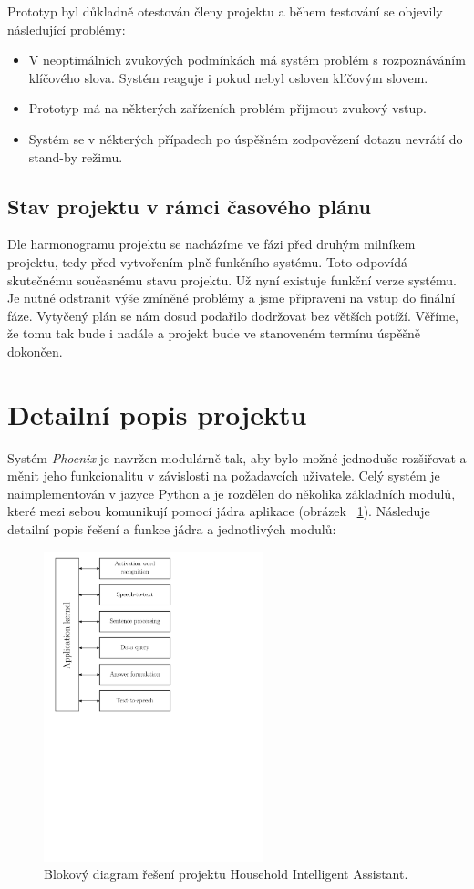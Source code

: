 \documentclass[12pt,a4paper]{article}
\begin{document}
Prototyp byl důkladně otestován členy projektu a během testování se objevily následující problémy: 
\begin{itemize}
	\item V neoptimálních zvukových podmínkách má systém problém s rozpoznáváním klíčového slova. Systém reaguje i pokud nebyl osloven klíčovým slovem.
	\item Prototyp má na některých zařízeních problém přijmout zvukový vstup.
	\item Systém se v některých případech po úspěšném zodpovězení dotazu nevrátí do stand-by režimu.
\end{itemize}


\subsection{Stav projektu v rámci časového plánu}
Dle harmonogramu projektu se nacházíme ve fázi před druhým milníkem projektu, tedy před vytvořením plně funkčního systému. Toto odpovídá skutečnému současnému stavu projektu. Už nyní existuje funkční verze systému. Je nutné odstranit výše zmíněné problémy a jsme připraveni na vstup do finální fáze. Vytyčený plán se nám dosud podařilo dodržovat bez větších potíží. Věříme, že tomu tak bude i nadále a projekt bude ve stanoveném termínu úspěšně dokončen.



\section{Detailní popis projektu}
Systém \textit{Phoenix} je navržen modulárně tak, aby bylo možné jednoduše rozšiřovat a měnit jeho funkcionalitu v závislosti na požadavcích uživatele. Celý systém je naimplementován v jazyce Python a je rozdělen do několika základních modulů, které mezi sebou komunikují pomocí jádra aplikace (obrázek ~\ref*{fig:diagram_api}). Následuje detailní popis řešení a funkce jádra a jednotlivých modulů:
\begin{figure}[ht]
	\begin{center}
		\includegraphics[height = 9cm]{blockDiagram.pdf}
		\caption{Blokový diagram řešení projektu Household Intelligent Assistant.}
		\label{fig:diagram_api}
	\end{center}
\end{figure}
\end{document}

